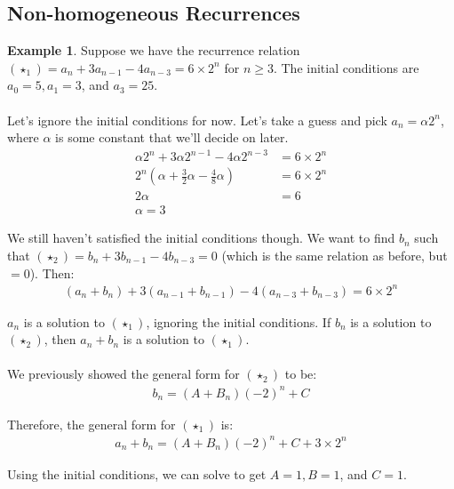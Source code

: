 \documentclass[]{article}
\theoremstyle{definition}
\newtheorem{ex}{Example}[section]
\begin{document}
		\subsection{Non-homogeneous Recurrences}
			\begin{ex}
				Suppose we have the recurrence relation $(\star_1) = a_n + 3a_{n - 1} - 4a_{n - 3} = 6 \times 2^n$ for $n \ge 3$. The initial conditions are $a_0 = 5, a_1 = 3$, and $a_3 = 25$.
				\\ \\
				Let's ignore the initial conditions for now. Let's take a guess and pick $a_n = \alpha 2^n$, where $\alpha$ is some constant that we'll decide on later.
				\begin{align*}
					\alpha 2^n + 3 \alpha 2^{n - 1} - 4 \alpha 2^{n - 3} &= 6 \times 2^n \\
					2^n(\alpha + \frac{3}{2} \alpha - \frac{4}{8} \alpha) &= 6 \times 2^n \\
					2 \alpha &= 6 \\
					\alpha = 3
				\end{align*}

				We still haven't satisfied the initial conditions though. We want to find $b_n$ such that $(\star_2) = b_n + 3b_{n - 1} - 4b_{n - 3} = 0$ (which is the same relation as before, but $= 0$). Then:
				\begin{align*}
					(a_n + b_n) + 3(a_{n - 1} + b_{n - 1}) - 4(a_{n - 3} + b_{n - 3}) = 6 \times 2^n
				\end{align*}

				$a_n$ is a solution to $(\star_1)$, ignoring the initial conditions. If $b_n$ is a solution to $(\star_2)$, then $a_n + b_n$ is a solution to $(\star_1)$.
				\\ \\
				We previously showed the general form for $(\star_2)$ to be:
				\begin{align*}
					b_n = (A + B_n)(-2)^n + C
				\end{align*}

				Therefore, the general form for $(\star_1)$ is:
				\begin{align*}
					a_n + b_n = (A + B_n) (-2)^n + C + 3 \times 2^n
				\end{align*}

				Using the initial conditions, we can solve to get $A = 1, B = 1$, and $C = 1$. \\
			\end{ex}
\end{document}
